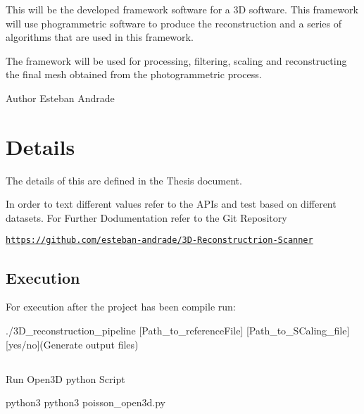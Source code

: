 This will be the developed framework software for a 3D software. This framework will use phogrammetric software to produce the reconstruction and a series of algorithms that are used in this framework.

The framework will be used for processing, filtering, scaling and reconstructing the final mesh obtained from the photogrammetric process.

\begin{DoxyAuthor}{Author}
Esteban Andrade
\end{DoxyAuthor}
\hypertarget{index_Details}{}\section{Details}\label{index_Details}
The details of this are defined in the Thesis document.

In order to text different values refer to the A\+P\+Is and test based on different datasets. For Further Dodumentation refer to the Git Repository

\href{https://github.com/esteban-andrade/3D-Reconstructrion-Scanner}{\tt https\+://github.\+com/esteban-\/andrade/3\+D-\/\+Reconstructrion-\/\+Scanner}\hypertarget{index_Execution}{}\subsection{Execution}\label{index_Execution}
For execution after the project has been compile run\+:

\begin{DoxyVerb}./3D_reconstruction_pipeline [Path_to_referenceFile] [Path_to_SCaling_file] [yes/no](Generate output files)
\end{DoxyVerb}
\hypertarget{_}{}\subsection{}\label{_}
Run Open3D python Script

\begin{DoxyVerb}python3 python3 poisson_open3d.py
\end{DoxyVerb}
 